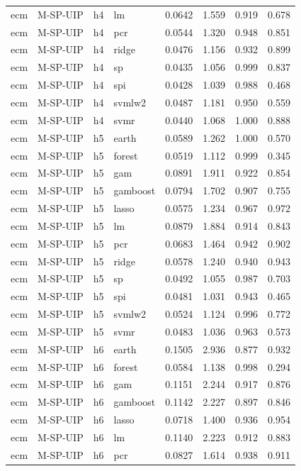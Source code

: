\begin{ThreePartTable}
\begin{longtable}[t]{llclcccc}
ecm & M-SP-UIP & h4 & lm & 0.0642 & 1.559 & 0.919 & 0.678\\
ecm & M-SP-UIP & h4 & pcr & 0.0544 & 1.320 & 0.948 & 0.851\\
ecm & M-SP-UIP & h4 & ridge & 0.0476 & 1.156 & 0.932 & 0.899\\
ecm & M-SP-UIP & h4 & sp & 0.0435 & 1.056 & 0.999 & 0.837\\
ecm & M-SP-UIP & h4 & spi & 0.0428 & 1.039 & 0.988 & 0.468\\
ecm & M-SP-UIP & h4 & svmlw2 & 0.0487 & 1.181 & 0.950 & 0.559\\
ecm & M-SP-UIP & h4 & svmr & 0.0440 & 1.068 & 1.000 & 0.888\\
\addlinespace
ecm & M-SP-UIP & h5 & earth & 0.0589 & 1.262 & 1.000 & 0.570\\
ecm & M-SP-UIP & h5 & forest & 0.0519 & 1.112 & 0.999 & 0.345\\
ecm & M-SP-UIP & h5 & gam & 0.0891 & 1.911 & 0.922 & 0.854\\
ecm & M-SP-UIP & h5 & gamboost & 0.0794 & 1.702 & 0.907 & 0.755\\
ecm & M-SP-UIP & h5 & lasso & 0.0575 & 1.234 & 0.967 & 0.972\\
ecm & M-SP-UIP & h5 & lm & 0.0879 & 1.884 & 0.914 & 0.843\\
ecm & M-SP-UIP & h5 & pcr & 0.0683 & 1.464 & 0.942 & 0.902\\
ecm & M-SP-UIP & h5 & ridge & 0.0578 & 1.240 & 0.940 & 0.943\\
ecm & M-SP-UIP & h5 & sp & 0.0492 & 1.055 & 0.987 & 0.703\\
ecm & M-SP-UIP & h5 & spi & 0.0481 & 1.031 & 0.943 & 0.465\\
ecm & M-SP-UIP & h5 & svmlw2 & 0.0524 & 1.124 & 0.996 & 0.772\\
ecm & M-SP-UIP & h5 & svmr & 0.0483 & 1.036 & 0.963 & 0.573\\
\addlinespace
ecm & M-SP-UIP & h6 & earth & 0.1505 & 2.936 & 0.877 & 0.932\\
ecm & M-SP-UIP & h6 & forest & 0.0584 & 1.138 & 0.998 & 0.294\\
ecm & M-SP-UIP & h6 & gam & 0.1151 & 2.244 & 0.917 & 0.876\\
ecm & M-SP-UIP & h6 & gamboost & 0.1142 & 2.227 & 0.897 & 0.846\\
ecm & M-SP-UIP & h6 & lasso & 0.0718 & 1.400 & 0.936 & 0.954\\
ecm & M-SP-UIP & h6 & lm & 0.1140 & 2.223 & 0.912 & 0.883\\
ecm & M-SP-UIP & h6 & pcr & 0.0827 & 1.614 & 0.938 & 0.911\\

\end{longtable}
\end{ThreePartTable}
